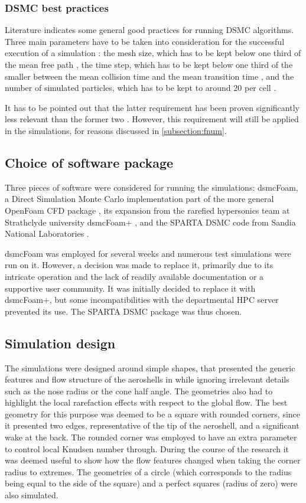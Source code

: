 \subsubsection{DSMC best practices}
\label{subsection:bestpractices}
Literature indicates some general good practices for running DSMC algorithms. Three main parameters have to be taken into consideration for the successful execution of a simulation \cite{purdue}: the mesh size, which has to be kept below one third of the mean free path \cite{purdue, fnum1}, the time step, which has to be kept below one third of the smaller between the mean collision time and the mean transition time \cite{purdue}, and the number of simulated particles, which has to be kept to around 20 per cell \cite{purdue}. 

It has to be pointed out that the latter requirement has been proven significantly less relevant than the former two \cite{fnum1, fnum2}. However, this requirement will still be applied in the simulations, for reasons discussed in \autoref{subsection:fnum}.

\subsection{Choice of software package}
Three pieces of software were considered for running the simulations: dsmcFoam, a Direct Simulation Monte Carlo implementation part of the more general OpenFoam CFD package \cite{openfoam}, its expansion from the rarefied hypersonics team at Strathclyde university dsmcFoam+ \cite{dsmcfoam+}, and the SPARTA DSMC code from Sandia National Laboratories \cite{sparta}.

dsmcFoam was employed for several weeks and numerous test simulations were run on it. However, a decision was made to replace it, primarily due to its intricate operation and the lack of readily available documentation or a supportive user community. It was initially decided to replace it with dsmcFoam+, but some incompatibilities with the departmental HPC server prevented its use. The SPARTA DSMC package was thus chosen.

\subsection{Simulation design}
The simulations were designed around simple shapes, that presented the generic features  and flow structure of the aeroshells in \cite{hathoraero1} while ignoring irrelevant details such as the nose radius or the cone half angle. The geometries also had to highlight the local rarefaction effects with respect to the global flow. The best geometry for this purpose was deemed to be a square with rounded corners, since it presented two edges, representative of the tip of the aeroshell, and a significant wake at the back. The rounded corner was employed to have an extra parameter to control local Knudsen number through. During the course of the research it was deemed useful to show how the flow features changed when taking the corner radius to extremes. The geometries of a circle (which corresponds to the radius being equal to the side of the square) and a perfect squares (radius of zero) were also simulated.

